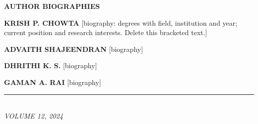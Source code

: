 \documentclass[10pt,twocolumn]{article}
\begin{document}
\vspace{10pt}
{\helv\fontsize{9}{11}\bfseries\color{accessblue}\MakeTextUppercase{Author Biographies}\par}
\vspace{4pt}
{\fontsize{8}{9.5}\selectfont

\noindent\begin{minipage}[t]{1.0in}\vspace{0pt}%
\end{minipage}\hfill
\begin{minipage}[t]{\dimexpr\columnwidth-1.1in\relax}\vspace{0pt}%
\textbf{KRISH P. CHOWTA} [biography: degrees with field, institution and year;
current position and research interests. Delete this bracketed text.]
\end{minipage}

\vspace{8pt}
\noindent\begin{minipage}[t]{1.0in}\vspace{0pt}%
\end{minipage}\hfill
\begin{minipage}[t]{\dimexpr\columnwidth-1.1in\relax}\vspace{0pt}%
\textbf{ADVAITH SHAJEENDRAN} [biography]
\end{minipage}

\vspace{8pt}
\noindent\begin{minipage}[t]{1.0in}\vspace{0pt}%
\end{minipage}\hfill
\begin{minipage}[t]{\dimexpr\columnwidth-1.1in\relax}\vspace{0pt}%
\textbf{DHRITHI K. S.} [biography]
\end{minipage}

\vspace{8pt}
\noindent\begin{minipage}[t]{1.0in}\vspace{0pt}%
\end{minipage}\hfill
\begin{minipage}[t]{\dimexpr\columnwidth-1.1in\relax}\vspace{0pt}%
\textbf{GAMAN A. RAI} [biography]
\end{minipage}

\vspace{6pt}
\noindent\rule{\columnwidth}{0.4pt}\\
{\fontsize{7}{8.5}\selectfont\itshape VOLUME 12, 2024\hfill}
}
\end{document}
